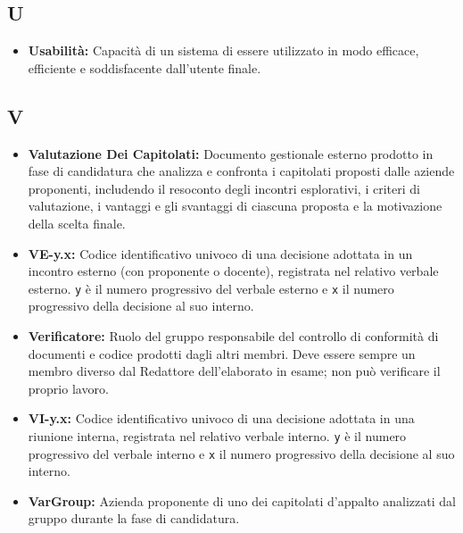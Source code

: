 {}
\subsection*{U}
\begin{itemize}
      \item \textbf{Usabilità:} Capacità di un sistema di essere utilizzato in modo efficace, efficiente e soddisfacente dall'utente finale.
\end{itemize}
 
{}
\subsection*{V}
\begin{itemize}[leftmargin=*]
    \item \textbf{Valutazione Dei Capitolati:} Documento gestionale esterno prodotto
          in fase di candidatura che analizza e confronta i capitolati proposti
          dalle aziende proponenti, includendo il resoconto degli incontri
          esplorativi, i criteri di valutazione, i vantaggi e gli svantaggi di
          ciascuna proposta e la motivazione della scelta finale.
    \item \textbf{VE-y.x:} Codice identificativo univoco di una decisione adottata
          in un incontro esterno (con proponente o docente), registrata nel relativo
          verbale esterno. \texttt{y} è il numero progressivo del verbale esterno
          e \texttt{x} il numero progressivo della decisione al suo interno.
    \item \textbf{Verificatore:} Ruolo del gruppo responsabile del controllo di
          conformità di documenti e codice prodotti dagli altri membri. Deve essere
          sempre un membro diverso dal Redattore dell'elaborato in esame; non può
          verificare il proprio lavoro.
    \item \textbf{VI-y.x:} Codice identificativo univoco di una decisione adottata
          in una riunione interna, registrata nel relativo verbale interno.
          \texttt{y} è il numero progressivo del verbale interno e \texttt{x} il
          numero progressivo della decisione al suo interno.
      \item \textbf{VarGroup:} Azienda proponente di uno dei capitolati d'appalto analizzati dal gruppo durante la fase di candidatura.
\end{itemize}
 
